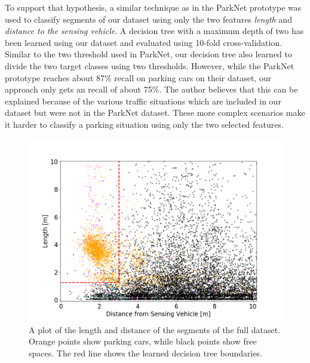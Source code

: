 To support that hypothesis, a similar technique as in the ParkNet prototype was used to classify segments of our dataset using only the two features \emph{length} and \emph{distance to the sensing vehicle}. A decision tree with a maximum depth of two has been learned using our dataset and evaluated using 10-fold cross-validation. Similar to the two threshold used in ParkNet, our decision tree also learned to divide the two target classes using two thresholds. However, while the ParkNet prototype reaches about 87\% recall on parking cars on their dataset, our approach only gets an recall of about 75\%. The author believes that this can be explained because of the various traffic situations which are included in our dataset but were not in the ParkNet dataset. These more complex scenarios make it harder to classify a parking situation using only the two selected features.


\begin{figure}
	\centering
	\includegraphics[width=\textwidth]{img/2d_length_distance_scatter_full_dataset_decision_tree_boundaries.png}
	\caption{A plot of the length and distance of the segments of the full dataset. Orange points show parking cars, while black points show free spaces. The red line shows the learned decision tree boundaries.}
	\label{fig:plot_2d_decision_tree}
\end{figure}

